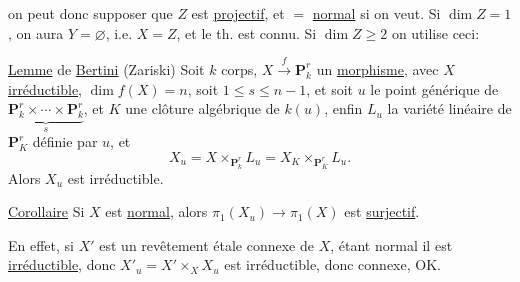 on peut donc supposer que $Z$ est \uline{projectif},
 et $=$ \uline{normal} si on veut.
Si 
$\dim Z=1$, on aura $Y=\varnothing$, i.e. $X=Z$,
et le th. est connu. Si $\dim Z\geq2$ on utilise ceci:

\uline{Lemme} de \uline{Bertini} (Zariski)
Soit $k$ corps,
$X\xrightarrow{f}\mathbf P_k^r$ un \uline{morphisme},
avec $X$ \uline{irréductible},
$\dim f(X)=n$, soit $1\leq s\leq n-1$, et soit $u$
le point générique de
$\underbrace{\mathbf P_k^r\times\cdots\times\mathbf P_k^r}_{s}$,
et $K$ une clôture algébrique de $k(u)$,
enfin $L_u$ la variété linéaire de $\mathbf P_K^r$ définie par $u$,
et
\[
X_u=X\times_{\mathbf P_k^r}L_u=X_K\times_{\mathbf P_K^r}L_u.
\]
Alors $X_u$ est irréductible.



\uline{Corollaire} 
Si $X$ est \uline{normal}, alors
$\pi_1(X_u)\to\pi_1(X)$ est \uline{surjectif}.

En effet, si $X'$ est un revêtement 
étale connexe de $X$, étant normal il est \uline{irréductible},
donc $X'_u=X'\times_X X_u$ est irréductible,
donc connexe, OK.

